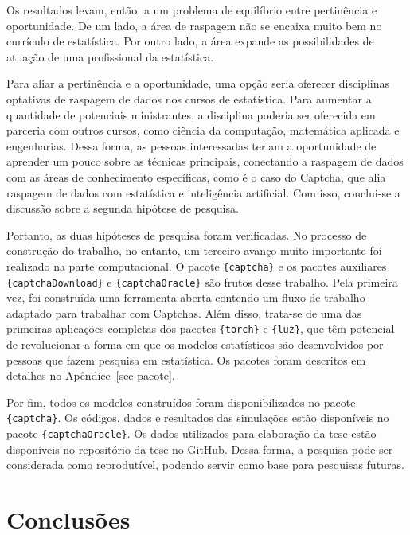 \documentclass[12pt,twoside,brazilian]{book}
\begin{document}
Os resultados levam, então, a um problema de equilíbrio entre
pertinência e oportunidade. De um lado, a área de raspagem não se
encaixa muito bem no currículo de estatística. Por outro lado, a área
expande as possibilidades de atuação de uma profissional da estatística.

Para aliar a pertinência e a oportunidade, uma opção seria oferecer
disciplinas optativas de raspagem de dados nos cursos de estatística.
Para aumentar a quantidade de potenciais ministrantes, a disciplina
poderia ser oferecida em parceria com outros cursos, como ciência da
computação, matemática aplicada e engenharias. Dessa forma, as pessoas
interessadas teriam a oportunidade de aprender um pouco sobre as
técnicas principais, conectando a raspagem de dados com as áreas de
conhecimento específicas, como é o caso do Captcha, que alia raspagem de
dados com estatística e inteligência artificial. Com isso, conclui-se a
discussão sobre a segunda hipótese de pesquisa.

Portanto, as duas hipóteses de pesquisa foram verificadas. No processo
de construção do trabalho, no entanto, um terceiro avanço muito
importante foi realizado na parte computacional. O pacote
\texttt{\{captcha\}} e os pacotes auxiliares
\texttt{\{captchaDownload\}} e \texttt{\{captchaOracle\}} são frutos
desse trabalho. Pela primeira vez, foi construída uma ferramenta aberta
contendo um fluxo de trabalho adaptado para trabalhar com Captchas. Além
disso, trata-se de uma das primeiras aplicações completas dos pacotes
\texttt{\{torch\}} e \texttt{\{luz\}}, que têm potencial de revolucionar
a forma em que os modelos estatísticos são desenvolvidos por pessoas que
fazem pesquisa em estatística. Os pacotes foram descritos em detalhes no
Apêndice~\ref{sec-pacote}.

Por fim, todos os modelos construídos foram disponibilizados no pacote
\texttt{\{captcha\}}. Os códigos, dados e resultados das simulações
estão disponíveis no pacote \texttt{\{captchaOracle\}}. Os dados
utilizados para elaboração da tese estão disponíveis no
\href{https://github.com/jtrecenti/doutorado}{repositório da tese no
GitHub}. Dessa forma, a pesquisa pode ser considerada como reprodutível,
podendo servir como base para pesquisas futuras.


\hypertarget{sec-conclusao}{%
\chapter{Conclusões}\label{sec-conclusao}}
\end{document}
